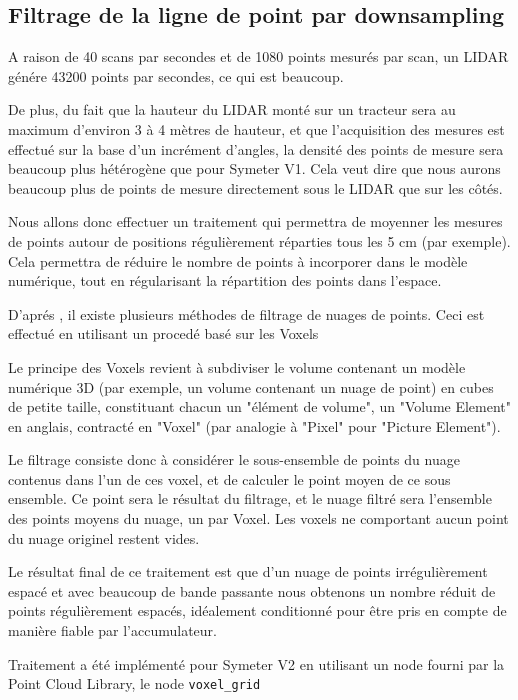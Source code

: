 \documentclass[12pt,a4paper]{report}
\begin{document}
	
		\subsection{Filtrage de la ligne de point par downsampling}
	
		\para A raison de 40 scans par secondes et de 1080 points mesurés par scan, un LIDAR génére 43200 points par secondes, ce qui est beaucoup.
	
		\para De plus, du fait que la hauteur du LIDAR monté sur un tracteur sera au maximum d'environ 3 à 4 mètres de hauteur, et que l'acquisition des mesures est effectué sur la base d'un incrément d'angles, la densité des points de mesure sera beaucoup plus hétérogène que pour Symeter V1. Cela veut dire que nous aurons beaucoup plus de points de mesure directement sous le LIDAR que sur les côtés.
	
		\para Nous allons donc effectuer un traitement qui permettra de moyenner les mesures de points autour de positions régulièrement réparties tous les 5 cm (par exemple). Cela permettra de réduire le nombre de points à incorporer dans le modèle numérique,  tout en régularisant la répartition des points dans l'espace.
		
		\para D'aprés \cite{moreno_comparative_2016}, il existe plusieurs méthodes de filtrage de nuages de points. Ceci est effectué en utilisant un procedé basé sur les Voxels
	
		\para Le principe des Voxels revient à subdiviser le volume contenant un modèle numérique 3D (par exemple, un volume contenant un nuage de point) en cubes de petite taille, constituant chacun un "élément de volume", un "Volume Element" en anglais, contracté en "Voxel" (par analogie à "Pixel" pour "Picture Element"). 
		
		\para Le filtrage consiste donc à considérer le sous-ensemble de points du nuage contenus dans l'un de ces voxel, et de calculer le point moyen de ce sous ensemble. Ce point sera le résultat du filtrage, et le nuage filtré sera l'ensemble des points moyens du nuage, un par Voxel. Les voxels ne comportant aucun point du nuage originel restent vides.
	
		
		\para Le résultat final de ce traitement est que d'un nuage de points irrégulièrement espacé et avec beaucoup de bande passante nous obtenons un nombre réduit de points régulièrement espacés, idéalement conditionné pour être pris en compte de manière fiable par l'accumulateur.
		
		\para Traitement a été implémenté pour Symeter V2 en utilisant un node fourni par la Point Cloud Library, le node \verb|voxel_grid|
		
\end{document}
